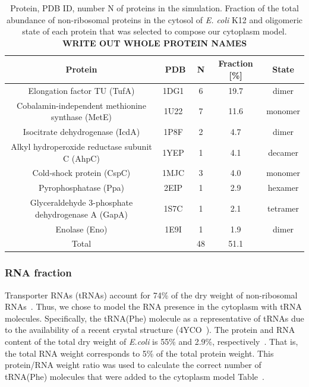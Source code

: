 \documentclass[journal=jcisd8,manuscript=article]{achemso}
\newcommand{\tabref}[1]{Table~\plainref{#1}}
\begin{document}
\begin{table}[H]
\centering
\caption{Protein, PDB ID, number N of proteins in the simulation. 
Fraction of the total abundance of non-ribosomal proteins in the cytosol of {\em
    E. coli} K12 and oligomeric state of each protein that was
  selected to compose our cytoplasm model. {\bf WRITE OUT WHOLE
    PROTEIN NAMES}}
\label{tbl:protein_fraction}
\begin{tabular}{ccccc}
\hline
Protein & PDB & N & Fraction [\%] & State\\
\hline
{\color{blue}Elongation factor TU} (TufA) & 1DG1~\cite{Abel1996}       & 6 & 19.7 &  dimer \\
{\color{blue}Cobalamin-independent methionine synthase} (MetE) & 1U22~\cite{Ferrer2004}     & 7 & 11.6 &  monomer \\
{\color{blue}Isocitrate dehydrogenase} (IcdA) & 1P8F~\cite{Mesecar2000}    & 2 & 4.7  &  dimer \\
{\color{blue}Alkyl hydroperoxide reductase subunit C} (AhpC) & 1YEP~\cite{Parsonage2005}  & 1 & 4.1  &  decamer \\
{\color{blue}Cold-shock protein} (CspC) & 1MJC~\cite{Schindelin1994} & 3 & 4.0  &  monomer \\
{\color{blue}Pyrophosphatase} (Ppa)  & 2EIP~\cite{Kankare1996}    & 1 & 2.9  &  hexamer \\
{\color{blue}Glyceraldehyde 3-phosphate dehydrogenase A} (GapA) & 1S7C~\cite{ShinXXX}        & 1 & 2.1  &  tetramer \\
{\color{blue}Enolase} (Eno)  & 1E9I~\cite{Kuhnel2001}     & 1 & 1.9  &  dimer \\
\hline
Total &                           & 48& 51.1 & \\
\hline
\end{tabular}
\end{table}


\subsubsection{RNA fraction}
Transporter RNAs (tRNAs) account for 74\% of the dry weight of
non-ribosomal RNAs~\cite{phillips2012}. Thus, we chose to model the
RNA presence in the cytoplasm with tRNA molecules. Specifically, 
 the tRNA(Phe) molecule as a representative of tRNAs due to
the availability of a recent crystal
structure (4YCO~\cite{Byrne2015}). The protein and RNA content of the total
dry weight of \textit{E.coli} is 55\% and 2.9\%,
respectively~\cite{phillips2012}. That is, the total RNA weight
corresponds to 5\% of the total protein weight. This protein/RNA
weight ratio was used to calculate the correct number of tRNA(Phe)
molecules that were added to the cytoplasm model
\tabref{tbl:soup_components}.
\end{document}
